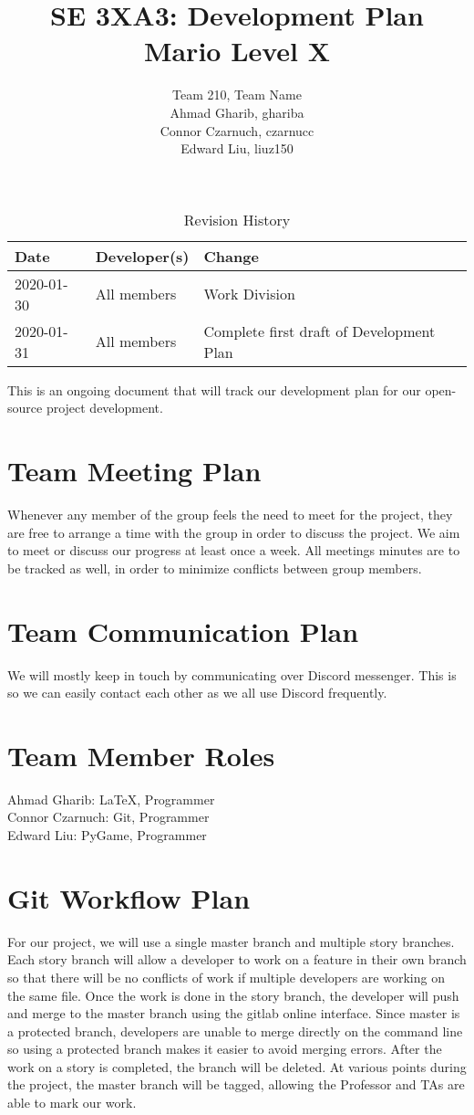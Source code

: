 \documentclass{article}
\title{SE 3XA3: Development Plan\\ Mario Level X}
\author{Team 210, Team Name
		\\ Ahmad Gharib, ghariba
		\\ Connor Czarnuch, czarnucc
		\\ Edward Liu, liuz150
}
\date{}
\begin{document}
\begin{table}[hp]
\caption{Revision History} \label{TblRevisionHistory}
\begin{tabularx}{\textwidth}{llX}
\toprule
\textbf{Date} & \textbf{Developer(s)} & \textbf{Change}\\
\midrule
2020-01-30 & All members & Work Division\\
2020-01-31 & All members & Complete first draft of Development Plan\\
\bottomrule
\end{tabularx}
\end{table}

\newpage

\maketitle

This is an ongoing document that will track our development plan for our open-source project development.

\section{Team Meeting Plan}
Whenever any member of the group feels the need to meet for the project, they are free to arrange a time with the group in order to discuss the project. We aim to meet or discuss our progress at least once a week. All meetings minutes are to be tracked as well, in order to minimize conflicts between group members.
\section{Team Communication Plan}
We will mostly keep in touch by communicating over Discord messenger. This is so we can easily contact each other as we all use Discord frequently.
\section{Team Member Roles}
Ahmad Gharib: LaTeX, Programmer \\
Connor Czarnuch: Git, Programmer \\
Edward Liu: PyGame, Programmer
\section{Git Workflow Plan}
For our project, we will use a single master branch and multiple story branches. Each story branch will allow a developer to work on a feature in their own branch so that there will be no conflicts of work if multiple developers are working on the same file. Once the work is done in the story branch, the developer will push and merge to the master branch using the gitlab online interface. Since master is a protected branch, developers are unable to merge directly on the command line so using a protected branch makes it easier to avoid merging errors. After the work on a story is completed, the branch will be deleted. At various points during the project, the master branch will be tagged, allowing the Professor and TAs are able to mark our work.
\end{document}
